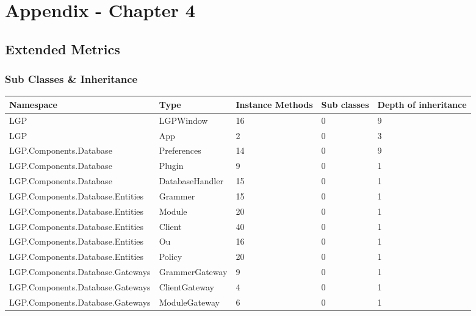 \chapter{Appendix - Chapter 4}
	\section{Extended Metrics}
	\label{sec:ExtendedMetrics}
	
		\subsection{Sub Classes \& Inheritance}
		\label{sec:SubclassesInheritance}
	
			\begin{table}[h!t]
				\footnotesize{\begin{tabular}{ | p{65mm} | p{28mm} | p{12mm} | p{12mm} | p{12mm}  | }	
																								\hline
				Namespace & Type  & Instance Methods & Sub classes & Depth of inheritance  \\ \hline
				LGP   & LGPWindow & 16    & 0     & 9  \\ \hline
				LGP   & App   & 2     & 0     & 3  \\ \hline
				LGP.Components.Database & Preferences & 14    & 0     & 9  \\ \hline
				LGP.Components.Database & Plugin & 9     & 0     & 1  \\ \hline
				LGP.Components.Database & DatabaseHandler & 15    & 0     & 1  \\ \hline
				LGP.Components.Database.Entities & Grammer & 15    & 0     & 1  \\ \hline
				LGP.Components.Database.Entities & Module & \cellcolor{ored}20    & 0     & 1  \\ \hline
				LGP.Components.Database.Entities & Client & \cellcolor{ored}40    & 0     & 1  \\ \hline
				LGP.Components.Database.Entities & Ou    & \cellcolor{ored}16    & 0     & 1  \\ \hline
				LGP.Components.Database.Entities & Policy & \cellcolor{ored}20    & 0     & 1  \\ \hline
				LGP.Components.Database.Gateways & GrammerGateway & 9     & 0     & 1  \\ \hline
				LGP.Components.Database.Gateways & ClientGateway & 4     & 0     & 1  \\ \hline
				LGP.Components.Database.Gateways & ModuleGateway & 6     & 0     & 1  \\ \hline

\end{tabular}}
\end{table}
